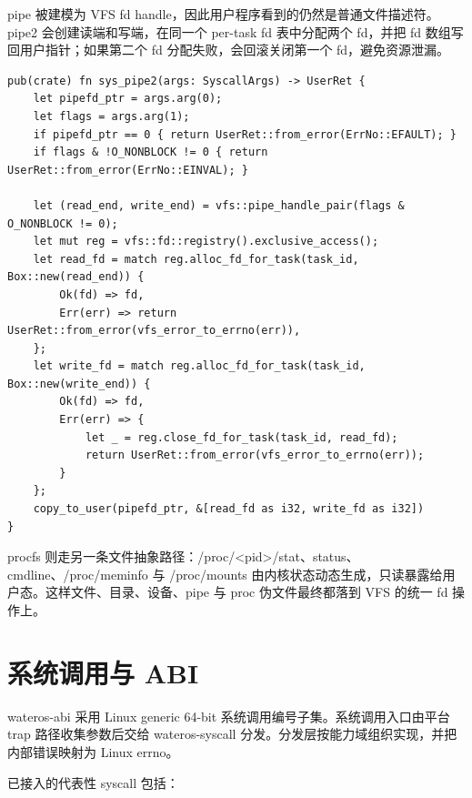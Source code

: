 \documentclass[12pt,openany,oneside,AutoFakeBold=true]{ctexbook}
\newcommand{\code}[1]{\textnormal{\rmfamily #1}}
\newcommand{\syscall}[1]{\textnormal{\rmfamily #1}}
\begin{document}
pipe 被建模为 VFS fd handle，因此用户程序看到的仍然是普通文件描述符。\syscall{pipe2} 会创建读端和写端，在同一个 per-task fd 表中分配两个 fd，并把 fd 数组写回用户指针；如果第二个 fd 分配失败，会回滚关闭第一个 fd，避免资源泄漏。

\begin{lstlisting}
pub(crate) fn sys_pipe2(args: SyscallArgs) -> UserRet {
    let pipefd_ptr = args.arg(0);
    let flags = args.arg(1);
    if pipefd_ptr == 0 { return UserRet::from_error(ErrNo::EFAULT); }
    if flags & !O_NONBLOCK != 0 { return UserRet::from_error(ErrNo::EINVAL); }

    let (read_end, write_end) = vfs::pipe_handle_pair(flags & O_NONBLOCK != 0);
    let mut reg = vfs::fd::registry().exclusive_access();
    let read_fd = match reg.alloc_fd_for_task(task_id, Box::new(read_end)) {
        Ok(fd) => fd,
        Err(err) => return UserRet::from_error(vfs_error_to_errno(err)),
    };
    let write_fd = match reg.alloc_fd_for_task(task_id, Box::new(write_end)) {
        Ok(fd) => fd,
        Err(err) => {
            let _ = reg.close_fd_for_task(task_id, read_fd);
            return UserRet::from_error(vfs_error_to_errno(err));
        }
    };
    copy_to_user(pipefd_ptr, &[read_fd as i32, write_fd as i32])
}
\end{lstlisting}

procfs 则走另一条文件抽象路径：\code{/proc/<pid>/stat}、\code{status}、\code{cmdline}、\code{/proc/meminfo} 与 \code{/proc/mounts} 由内核状态动态生成，只读暴露给用户态。这样文件、目录、设备、pipe 与 proc 伪文件最终都落到 VFS 的统一 fd 操作上。

\section{系统调用与 ABI}

\code{wateros-abi} 采用 Linux generic 64-bit 系统调用编号子集。系统调用入口由平台 trap 路径收集参数后交给 \code{wateros-syscall} 分发。分发层按能力域组织实现，并把内部错误映射为 Linux errno。

已接入的代表性 syscall 包括：
\end{document}

